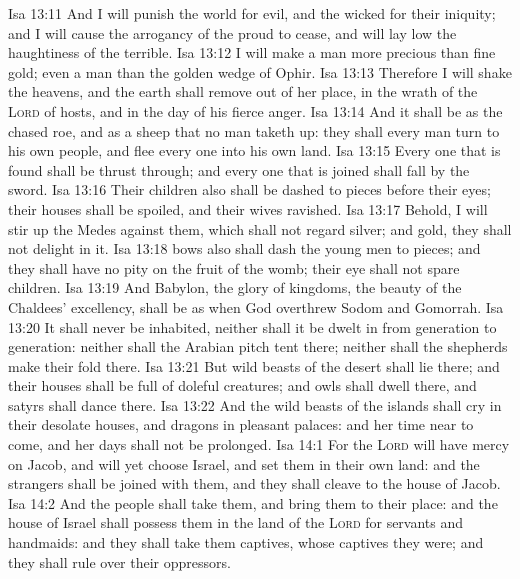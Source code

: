 \vs Isa 13:11 And I will punish the world for  evil, and the wicked for their iniquity; and I will cause the arrogancy of the proud to cease, and will lay low the haughtiness of the terrible.
\vs Isa 13:12 I will make a man more precious than fine gold; even a man than the golden wedge of Ophir.
\vs Isa 13:13 Therefore I will shake the heavens, and the earth shall remove out of her place, in the wrath of the \textsc{Lord} of hosts, and in the day of his fierce anger.
\vs Isa 13:14 And it shall be as the chased roe, and as a sheep that no man taketh up: they shall every man turn to his own people, and flee every one into his own land.
\vs Isa 13:15 Every one that is found shall be thrust through; and every one that is joined  shall fall by the sword.
\vs Isa 13:16 Their children also shall be dashed to pieces before their eyes; their houses shall be spoiled, and their wives ravished.
\vs Isa 13:17 Behold, I will stir up the Medes against them, which shall not regard silver; and  gold, they shall not delight in it.
\vs Isa 13:18  bows also shall dash the young men to pieces; and they shall have no pity on the fruit of the womb; their eye shall not spare children.
\vs Isa 13:19 And Babylon, the glory of kingdoms, the beauty of the Chaldees' excellency, shall be as when God overthrew Sodom and Gomorrah.
\vs Isa 13:20 It shall never be inhabited, neither shall it be dwelt in from generation to generation: neither shall the Arabian pitch tent there; neither shall the shepherds make their fold there.
\vs Isa 13:21 But wild beasts of the desert shall lie there; and their houses shall be full of doleful creatures; and owls shall dwell there, and satyrs shall dance there.
\vs Isa 13:22 And the wild beasts of the islands shall cry in their desolate houses, and dragons in  pleasant palaces: and her time  near to come, and her days shall not be prolonged.
\vs Isa 14:1 For the \textsc{Lord} will have mercy on Jacob, and will yet choose Israel, and set them in their own land: and the strangers shall be joined with them, and they shall cleave to the house of Jacob.
\vs Isa 14:2 And the people shall take them, and bring them to their place: and the house of Israel shall possess them in the land of the \textsc{Lord} for servants and handmaids: and they shall take them captives, whose captives they were; and they shall rule over their oppressors.
